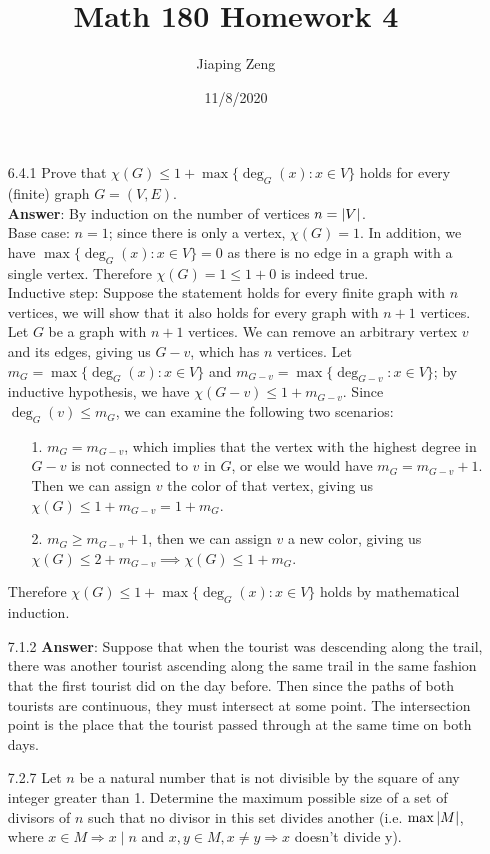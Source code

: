 \documentclass{article}
\title{Math 180 Homework 4}
\date{11/8/2020}
\author{Jiaping Zeng}
\begin{document}
\maketitle

\begin{itemize}
      \item [6.4.1] Prove that $\chi(G)\leq 1+\max\{\deg_G(x):x\in V\}$ holds for every (finite) graph $G=(V,E)$.\\
            \textbf{Answer}: By induction on the number of vertices $n=\abs{V}$.\\
            Base case: $n=1$; since there is only a vertex, $\chi(G)=1$. In addition, we have $\max\{\deg_G(x):x\in V\}=0$ as there is no edge in a graph with a single vertex. Therefore $\chi(G)=1\leq 1+0$ is indeed true.\\
            Inductive step: Suppose the statement holds for every finite graph with $n$ vertices, we will show that it also holds for every graph with $n+1$ vertices. Let $G$ be a graph with $n+1$ vertices. We can remove an arbitrary vertex $v$ and its edges, giving us $G-v$, which has $n$ vertices. Let $m_G=\max\{\deg_G(x):x\in V\}$ and $m_{G-v}=\max\{\deg_{G-v}:x\in V\}$; by inductive hypothesis, we have $\chi(G-v)\leq 1+m_{G-v}$. Since $\deg_G(v)\leq m_G$, we can examine the following two scenarios:
            \begin{itemize}
                  \item [1.] $m_G=m_{G-v}$, which implies that the vertex with the highest degree in $G-v$ is not connected to $v$ in $G$, or else we would have $m_G=m_{G-v}+1$. Then we can assign $v$ the color of that vertex, giving us $\chi(G)\leq 1+m_{G-v}=1+m_G$.
                  \item [2.] $m_G\geq m_{G-v}+1$, then we can assign $v$ a new color, giving us $\chi(G)\leq 2+m_{G-v}\implies\chi(G)\leq 1+m_G$.
            \end{itemize}
            Therefore $\chi(G)\leq 1+\max\{\deg_G(x):x\in V\}$ holds by mathematical induction.
      \item [7.1.2]
            \textbf{Answer}: Suppose that when the tourist was descending along the trail, there was another tourist ascending along the same trail in the same fashion that the first tourist did on the day before. Then since the paths of both tourists are continuous, they must intersect at some point. The intersection point is the place that the tourist passed through at the same time on both days.
      \item [7.2.7] Let $n$ be a natural number that is not divisible by the square of any integer greater than 1. Determine the maximum possible size of a set of divisors of $n$ such that no divisor in this set divides another (i.e. $\max\abs{M}$, where $x\in M\Rightarrow x\mid n$ and $x,y\in M,x\neq y\Rightarrow x$ doesn't divide y).\\

\end{itemize}
\end{document}
